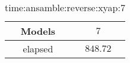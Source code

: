 \begin{table}[!ht]
	\centering
	\begin{tabular}{|c|c|}
		\hline
		Models & $7$ \\ \hline
		elapsed & $848.72$ \\ \hline
	\end{tabular}
	\caption{time:ansamble:reverse:xyap:7}
	\label{tab:time:ansamble:reverse:xyap:7}
\end{table}
